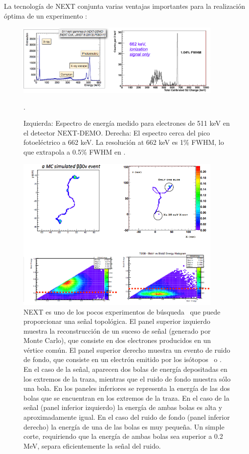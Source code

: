 La tecnología de NEXT conjunta varias ventajas importantes para la realización óptima de un experimento \bbonu:
                                    
\begin{figure}
\centering
\includegraphics[width=0.9\textwidth]{img/EResolution.png}
\caption{\small Izquierda: Espectro de energía medido para electrones de 511 keV en el detector NEXT-DEMO. Derecha: El espectro cerca del pico fotoeléctrico a 662 keV. La resolución at 662 keV es 1\% FWHM, lo que extrapola a 0.5\% FWHM en \Qbb.}
\label{fig.ERES}. 
\end{figure}

\begin{figure}
\centering
\includegraphics[width=0.9\textwidth]{img/Topo2.png}
\caption{\small NEXT es uno de los pocos experimentos de búsqueda \bbonu\ que puede proporcionar una señal topológica. El panel superior izquierdo muestra la reconstrucción de un suceso de señal (generado por Monte Carlo), que consiste en dos electrones producidos en un vértice común. El panel superior derecho muestra un evento de ruido de fondo, que consiste en un electrón emitido por los isótopos  \BI\ o \TL. En el caso de la señal, aparecen dos bolas de energía depositadas en los extremos de la traza, mientras que el ruido de fondo muestra sólo una bola. En los paneles inferiores se representa la energía de las dos bolas que se encuentran en los extremos de la traza. En el caso de la señal (panel inferior izquierdo) la energía de ambas bolas es alta y aproximadamente igual. En el caso del ruido de fondo (panel inferior derecho) la energía de una de las bolas es muy pequeña. Un simple corte, requiriendo que la energía de ambas bolas sea superior a 0.2 MeV, separa eficientemente la señal del ruido.}\label{fig.ETRK2}
\end{figure}

